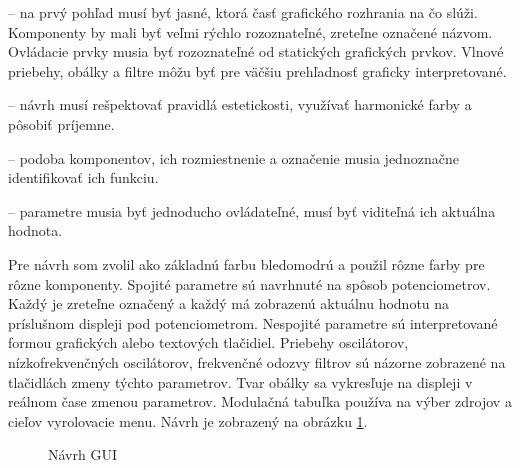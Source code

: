 \begin{description}
\setlength{\itemsep}{-0.5ex}
\item[Prehľadnosť] -- na prvý pohľad musí byť jasné, ktorá časť grafického rozhrania na čo slúži. Komponenty by mali byť veľmi rýchlo rozoznateľné, zreteľne označené názvom. Ovládacie prvky musia byť rozoznateľné od statických grafických prvkov. Vlnové priebehy, obálky a filtre môžu byť pre väčšiu prehľadnosť graficky interpretované.
\item[Estetickosť] -- návrh musí rešpektovať pravidlá estetickosti, využívať harmonické farby a pôsobiť príjemne.
\item[Jednoznačnosť] -- podoba komponentov, ich rozmiestnenie a označenie musia jednoznačne identifikovať ich funkciu.
\item[Ovládateľnosť] -- parametre musia byť jednoducho ovládateľné, musí byť viditeľná ich aktuálna hodnota. 
\end{description}

Pre návrh som zvolil ako základnú farbu bledomodrú a použil rôzne farby pre rôzne komponenty. Spojité parametre sú navrhnuté na spôsob potenciometrov. Každý je zreteľne označený a každý má zobrazenú aktuálnu hodnotu na príslušnom displeji pod potenciometrom. Nespojité parametre sú interpretované formou grafických alebo textových tlačidiel. Priebehy oscilátorov, nízkofrekvenčných oscilátorov, frekvenčné odozvy filtrov sú názorne zobrazené na tlačidlách zmeny týchto parametrov. Tvar obálky sa vykresľuje na displeji v reálnom čase zmenou parametrov. Modulačná tabuľka používa na výber zdrojov a cieľov vyrolovacie menu. Návrh je zobrazený na obrázku \ref{obr10}.

\begin{figure}[h]
\centering
{}
\caption{\label{obr10} Návrh GUI}
\end{figure}
